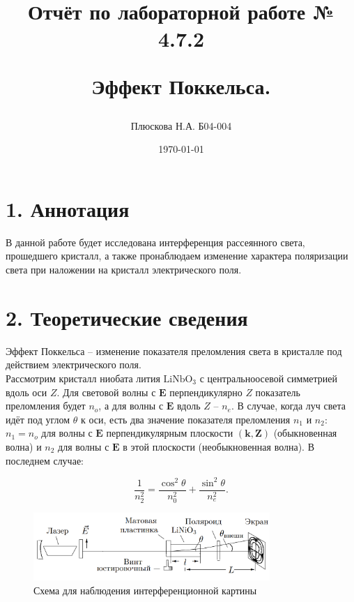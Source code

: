 \documentclass[a4paper,12pt]{report}
\title{Отчёт по лабораторной работе № 4.7.2 

Эффект Поккельса.}
\author{Плюскова Н.А. Б04-004 }
\date{\today}
\begin{document}
\maketitle
\section*{1. Аннотация}

В данной работе будет исследована интерференция рассеянного света, прошедшего кристалл, а также пронаблюдаем изменение характера поляризации света при наложении на кристалл электрического поля.

\section*{2. Теоретические сведения}

Эффект Поккельса -- изменение показателя преломления света в кристалле под действием электрического поля.\\
Рассмотрим кристалл ниобата лития $\text{LiNbO}_3$ с центральноосевой симметрией вдоль оси $Z$. Для световой волны с $\mathbf{E}$ перпендикулярно $Z$ показатель преломления будет $n_o$, а для волны с $\mathbf{E}$ вдоль $Z$ -- $n_e$. В случае, когда луч света идёт под углом $\theta$ к оси, есть два значение показателя преломления $n_1$ и $n_2$: $n_1 = n_o$ для волны с $\mathbf{E}$ перпендикулярным плоскости $(\mathbf{k},\mathbf{Z})$ (обыкновенная волна) и $n_2$ для волны с $\mathbf{E}$ в этой плоскости (необыкновенная волна). В последнем случае:

\begin{equation}
\dfrac{1}{n_2^2}=\dfrac{\cos^2 \theta}{n_0^2}+\dfrac{\sin^2 \theta}{n_e^2}.
\end{equation}

\begin{figure}[H]
\includegraphics[width = 0.8\textwidth]{1.png}
\centering
\caption{Схема для наблюдения интерференционной картины }
\end{figure}
\end{document}
